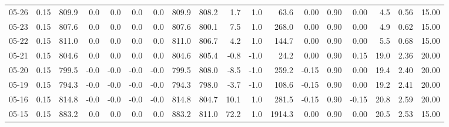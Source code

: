 \begin{threeparttable}
{\begin{tabular}{lrrrrrrrrrrrrrrrrr}
  05-26 &     0.15 & 809.9 &               0.0 &               0.0 &                0.0 &                0.0 & 809.9 & 808.2 &        1.7 &                      1.0 &                63.6 &       0.00 &      0.90 &           0.00 &              4.5 &            0.56 &                  15.00 \\
  05-23 &     0.15 & 807.6 &               0.0 &               0.0 &                0.0 &                0.0 & 807.6 & 800.1 &        7.5 &                      1.0 &               268.0 &       0.00 &      0.90 &           0.00 &              4.9 &            0.62 &                  15.00 \\
  05-22 &     0.15 & 811.0 &               0.0 &               0.0 &                0.0 &                0.0 & 811.0 & 806.7 &        4.2 &                      1.0 &               144.7 &       0.00 &      0.90 &           0.00 &              5.5 &            0.68 &                  15.00 \\
  05-21 &     0.15 & 804.6 &               0.0 &               0.0 &                0.0 &                0.0 & 804.6 & 805.4 &       -0.8 &                     -1.0 &                24.2 &       0.00 &      0.90 &           0.15 &             19.0 &            2.36 &                  20.00 \\
  05-20 &     0.15 & 799.5 &              -0.0 &              -0.0 &               -0.0 &               -0.0 & 799.5 & 808.0 &       -8.5 &                     -1.0 &               259.2 &      -0.15 &      0.90 &           0.00 &             19.4 &            2.40 &                  20.00 \\
  05-19 &     0.15 & 794.3 &              -0.0 &              -0.0 &               -0.0 &               -0.0 & 794.3 & 798.0 &       -3.7 &                     -1.0 &               108.6 &      -0.15 &      0.90 &           0.00 &             19.2 &            2.41 &                  20.00 \\
  05-16 &     0.15 & 814.8 &              -0.0 &              -0.0 &               -0.0 &               -0.0 & 814.8 & 804.7 &       10.1 &                      1.0 &               281.5 &      -0.15 &      0.90 &          -0.15 &             20.8 &            2.59 &                  20.00 \\
  05-15 &     0.15 & 883.2 &               0.0 &               0.0 &                0.0 &                0.0 & 883.2 & 811.0 &       72.2 &                      1.0 &              1914.3 &       0.00 &      0.90 &           0.00 &             20.5 &            2.53 &                  15.00 \\

\end{tabular}}
\end{threeparttable}

